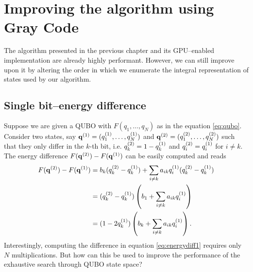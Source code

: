\section{Improving the algorithm using Gray Code}

The algorithm presented in the previous chapter and its GPU--enabled
implementation are already highly performant. However, we can still improve
upon it by altering the order in which we enumerate the integral representation
of states used by our algorithm.

\subsection{Single bit--energy difference}
Suppose we are given a QUBO with $F(q_{1},\ldots,q_{N})$ as in the equation
\ref{eq:qubo}. Consider two states, say $\mathbf{q}^{(1)} = (q^{(1)}_{1},\ldots,q^{(1)}_{N})$
and $\mathbf{q}^{(2)}=(q^{(2)}_{1},\ldots,q^{(2)}_{N})$ such that they only differ in the
$k$-th bit, i.e. $q^{(2)}_{k}=1-q^{(1)}_{k}$ and $q^{(2)}_{i}=q^{(1)}_{i}$ for $i \ne
  k$. The energy difference $F(\mathbf{q}^{(2)})-F(\mathbf{q}^{(1)})$ can be easily computed and
reads
\begin{align}
  \begin{split}
    \label{eq:energydiff1}
    F(\mathbf{q}^{(2)})-F(\mathbf{q}^{(1)}) &= b_{k}(q^{(2)}_{k}-q^{(1)}_{k}) + \sum_{i\ne k}a_{ik}q^{(1)}_{i}(q^{(2)}_{k} - q^{(1)}_{k}) \\
    &= (q^{(2)}_{k}-q^{(1)}_{k}) \left(b_{1} + \sum_{i \ne k}a_{ik}q^{(1)}_{i}\right) \\
    & = (1-2q^{(1)}_{k}) \left(b_{k} + \sum_{i \ne k}a_{ik}q^{(1)}_{i}\right).
  \end{split}
\end{align}
Interestingly, computing the difference in equation \eqref{eq:energydiff1} requires only $N$ multiplications.   But how can this be used to improve the performance of the exhaustive search through QUBO state space?

